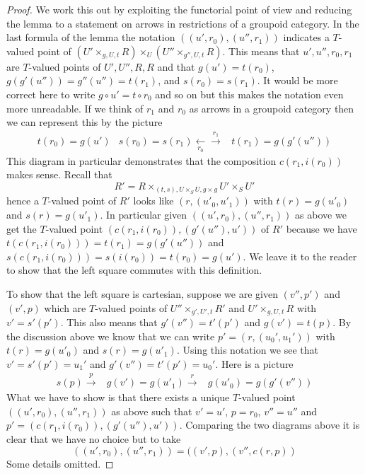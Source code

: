 \begin{proof}
We work this out by exploiting the functorial point of view
and reducing the lemma to a statement on arrows in restrictions
of a groupoid category. In the last formula of the lemma the
notation $((u', r_0), (u'', r_1))$ indicates a $T$-valued point of
$(U' \times_{g, U, t} R) \times_U (U'' \times_{g'', U, t} R)$.
This means that $u', u'', r_0, r_1$ are $T$-valued points of $U', U'', R, R$
and that $g(u') = t(r_0)$, $g(g'(u'')) = g''(u'') = t(r_1)$, and
$s(r_0) = s(r_1)$. It would be more correct here to write
$g \circ u' = t \circ r_0$ and so on but this makes the notation
even more unreadable. If we think of $r_1$ and $r_0$ as arrows in
a groupoid category then we can represent this by the picture
$$
\begin{array}{ccc}t(r_0) = g(u') & s(r_0) = s(r_1) \underset{r_0}{\longleftarrow}\overset{r_1}{\longrightarrow} & t(r_1) = g(g'(u''))\end{array}
$$
This diagram in particular demonstrates that the composition
$c(r_1, i(r_0))$ makes sense. Recall that
$$
R' = R \times_{(t, s), U \times_S U, g \times g} U' \times_S U'
$$
hence a $T$-valued point of $R'$ looks like $(r, (u'_0, u'_1))$
with $t(r) = g(u'_0)$ and $s(r) = g(u'_1)$. In particular given
$((u', r_0), (u'', r_1))$ as above we get the $T$-valued point
$(c(r_1, i(r_0)), (g'(u''), u'))$ of $R'$ because we have
$t(c(r_1, i(r_0))) = t(r_1) = g(g'(u''))$ and
$s(c(r_1, i(r_0))) = s(i(r_0)) = t(r_0) = g(u')$.
We leave it to the reader to show that the left square commutes
with this definition.

\medskip\noindent
To show that the left square is cartesian,
suppose we are given $(v'', p')$ and $(v', p)$ which are $T$-valued points of
$U'' \times_{g', U', t} R'$ and $U' \times_{g, U, t} R$ with
$v' = s'(p')$. This also means that $g'(v'') = t'(p')$ and
$g(v') = t(p)$. By the discussion above we know that we can write
$p' = (r, (u_0', u_1'))$ with $t(r) = g(u'_0)$ and
$s(r) = g(u'_1)$. Using this notation we see that
$v' = s'(p') = u_1'$ and
$g'(v'') = t'(p') = u_0'$. Here is a picture
$$
\begin{array}{ccc}s(p) \overset{p}{\longrightarrow} & g(v') = g(u'_1) \overset{r}{\longrightarrow} & g(u'_0) = g(g'(v''))\end{array}
$$
What we have to show is that there exists a unique $T$-valued point
$((u', r_0), (u'', r_1))$ as above such that
$v' = u'$, $p = r_0$, $v'' = u''$ and $p' = (c(r_1, i(r_0)), (g'(u''), u'))$.
Comparing the two diagrams above it is clear that we have no choice
but to take
$$
((u', r_0), (u'', r_1)) = ((v', p), (v'', c(r, p))
$$
Some details omitted.
\end{proof}


